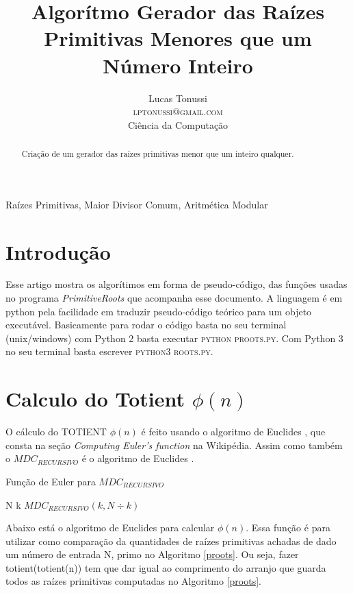 \documentclass[conference]{IEEEtran}
\title{Algorítmo Gerador das Raízes Primitivas Menores que um Número Inteiro}
\author {
  Lucas Tonussi\\
  \textsc{lptonussi@gmail.com}\\
  \small{Ciência da Computação}
}
\begin{document}
\maketitle

\begin{abstract}
Criação de um gerador das raízes primitivas menor que um inteiro qualquer.
\end{abstract}

\IEEEoverridecommandlockouts

\begin{keywords}
Raízes Primitivas, Maior Divisor Comum, Aritmética Modular
\end{keywords}

\IEEEpeerreviewmaketitle

\section{Introdução}

Esse artigo mostra os algorítimos em forma de pseudo-código, das funções usadas
no programa \textit{PrimitiveRoots} que acompanha esse documento. A linguagem é
em python pela facilidade em traduzir pseudo-código teórico para um objeto
executável. Basicamente para rodar o código basta no seu terminal (unix/windows)
com Python 2 basta executar \textsc{python proots.py}. Com Python 3 no seu
terminal basta escrever \textsc{python3 roots.py}.

\section{Calculo do Totient $\phi(n)$}

O cálculo do TOTIENT $\phi(n)$ é feito usando o algoritmo de Euclides
\cite{totient}, que consta na seção \textit{Computing Euler's function} na
Wikipédia. Assim como também o $MDC_{RECURSIVO}$ é o algoritmo de Euclides
\cite{gcd}.

\begin{algorithm}
  \caption{Função de Euler para $MDC_{RECURSIVO}$}\label{mdcrec}
  \begin{algorithmic}
        \State \Return N
      \EndIf
        \State \Return k
      \EndIf
      \Return $MDC_{RECURSIVO}(k, N \div k)$
    \EndFunction
  \end{algorithmic}
\end{algorithm}

Abaixo está o algoritmo de Euclides para calcular $\phi(n)$. Essa função é para
utilizar como comparação da quantidades de raízes primitivas achadas de dado um
número de entrada N, primo no Algoritmo \ref{proots}. Ou seja, fazer
totient(totient(n)) tem que dar igual ao comprimento do arranjo que guarda todos
as raízes primitivas computadas no Algoritmo \ref{proots}.
\end{document}
